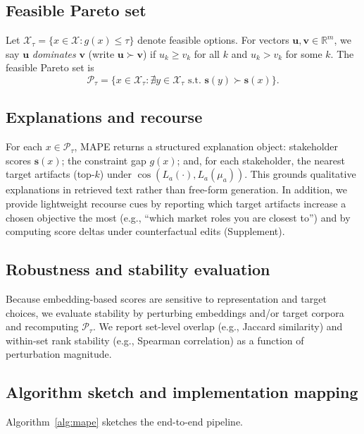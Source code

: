 \documentclass[sigconf,review]{acmart}
\newcommand{\MAPE}{\textsc{MAPE}\xspace}
\begin{document}
\subsection{Feasible Pareto set}
Let $\mathcal{X}_\tau=\{x\in\mathcal{X}: g(x)\le\tau\}$ denote feasible options. For vectors $\mathbf{u},\mathbf{v}\in\mathbb{R}^m$, we say $\mathbf{u}$ \emph{dominates} $\mathbf{v}$ (write $\mathbf{u}\succ \mathbf{v}$) if $u_k\ge v_k$ for all $k$ and $u_k>v_k$ for some $k$. The feasible Pareto set is
\begin{equation}
  \mathcal{P}_\tau = \big\{x\in\mathcal{X}_\tau : \nexists y\in\mathcal{X}_\tau \text{ s.t. } \mathbf{s}(y)\succ \mathbf{s}(x)\big\}.
\end{equation}

\subsection{Explanations and recourse}
\label{subsec:explain}
For each $x\in\mathcal{P}_\tau$, \MAPE returns a structured explanation object: stakeholder scores $\mathbf{s}(x)$; the constraint gap $g(x)$; and, for each stakeholder, the nearest target artifacts (top-$k$) under $\cos(L_a(\cdot),L_a(\mu_a))$. This grounds qualitative explanations in retrieved text rather than free-form generation. In addition, we provide lightweight recourse cues by reporting which target artifacts increase a chosen objective the most (e.g., ``which market roles you are closest to'') and by computing score deltas under counterfactual edits (Supplement).

\subsection{Robustness and stability evaluation}
Because embedding-based scores are sensitive to representation and target choices, we evaluate stability by perturbing embeddings and/or target corpora and recomputing $\mathcal{P}_\tau$. We report set-level overlap (e.g., Jaccard similarity) and within-set rank stability (e.g., Spearman correlation) as a function of perturbation magnitude.

\subsection{Algorithm sketch and implementation mapping}
Algorithm~\ref{alg:mape} sketches the end-to-end pipeline.
\end{document}
